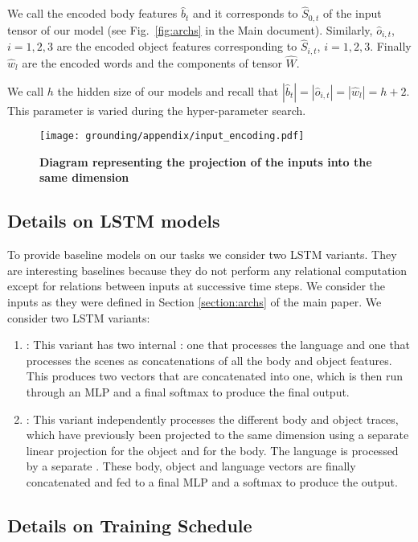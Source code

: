We call the encoded body features $\hat{b}_t$ and it corresponds to $\hat{S}_{0,t}$ of the input tensor of our model (see Fig.~\ref{fig:archs} in the Main document). Similarly, $\hat{o}_{i,t}$, $i=1,2,3$ are the encoded object features corresponding to $\hat{S}_{i,t}$, $i=1,2,3$. Finally $\hat{w}_l$ are the encoded words and the components of tensor $\hat{W}$.

We call $h$ the hidden size of our models and recall that $|\hat{b}_t|=|\hat{o}_{i,t}|=|\hat{w}_l|=h+2$. This parameter is varied during the hyper-parameter search.

\begin{figure}[h]
    \centering
    \texttt{[image: grounding/appendix/input\_encoding.pdf]}
    \caption{\textbf{Diagram representing the projection of the inputs into the same dimension}}
    \label{fig:input_encoding}
\end{figure}

\subsection{Details on LSTM models}\label{sup:lstm_details}

To provide baseline models on our tasks we consider two LSTM variants. They are interesting baselines because they do not perform any relational computation except for relations between inputs at successive time steps. We consider the inputs as they were defined in Section \ref{section:archs} of the main paper. We consider two LSTM variants:

\begin{enumerate}
    \item \lstmfl: This variant has two internal \lstm: one that processes the language and one that processes the scenes as concatenations of all the body and object features. This produces two vectors that are concatenated into one, which is then run through an MLP and a final softmax to produce the final output.
    \item \lstmfa: This variant independently processes the different body and object traces, which have previously been projected to the same dimension using a separate linear projection for the object and for the body. The language is processed by a separate \lstm. These body, object and language vectors are finally concatenated and fed to a final MLP and a softmax to produce the output.
\end{enumerate}

\subsection{Details on Training Schedule} \label{sup:hparam}

